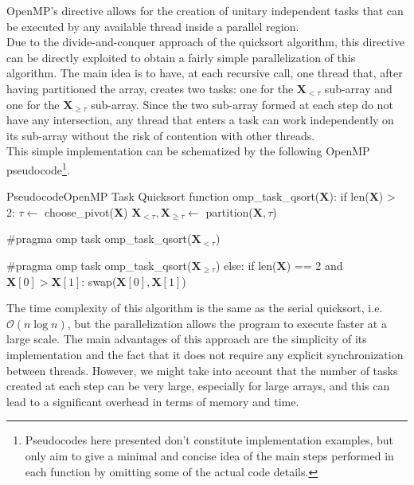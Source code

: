 \documentclass[../main.tex]{subfiles}
\begin{document}
OpenMP's  directive allows for the creation of unitary
independent tasks that can be executed by any available thread inside a
parallel region.\\
Due to the divide-and-conquer approach of the quicksort algorithm, this
directive can be directly exploited to obtain a fairly simple parallelization
of this algorithm. The main idea is to have, at each recursive call, one thread
that, after having partitioned the array, creates two tasks: one for the
$\mathbf{X}_{< \tau}$ sub-array and one for the $\mathbf{X}_{\geq \tau}$ sub-array. Since the two sub-array formed at each step do not have any
intersection, any thread that enters a task can work independently on
its sub-array without the risk of contention with other threads.\\
This simple implementation can be schematized by the following OpenMP
pseudocode\footnote{
Pseudocodes here presented don't constitute implementation examples, but only aim to give a minimal and concise idea of the main steps performed in each function by omitting some of the actual code details.
}.

\begin{codeblock}
\begin{code}{Pseudocode}{OpenMP Task Quicksort}
function omp_task_qsort($\mathbf{X}$):
    if len($\mathbf{X}$) > 2:
        $\tau \leftarrow$ choose_pivot($\mathbf{X}$)
        $\mathbf{X}_{< \tau}, \mathbf{X}_{\geq \tau} \leftarrow$ partition($\mathbf{X}, \tau$)

        #pragma omp task
        omp_task_qsort($\mathbf{X}_{< \tau}$)

        #pragma omp task
        omp_task_qsort($\mathbf{X}_{\geq \tau}$)
    else:
        if len($\mathbf{X}$) == 2 and $\mathbf{X}[0] > \mathbf{X}[1]$:
            swap($\mathbf{X}[0], \mathbf{X}[1]$)
\end{code}
\caption{Pseudocode for the OpenMP  function. Recursion ends when the array has length less then 2, where a simple swap is performed if needed.}
\label{code:omp_task}
\end{codeblock}

The time complexity of this algorithm is the same as the serial quicksort, i.e.\ $\mathcal{O}(n \log n)$, but the parallelization allows the program to execute faster at a large scale. The main advantages of this approach are the simplicity of its implementation and the fact that it does not require any explicit synchronization between threads. However, we might take into account that the number of tasks created at each step can be very large, especially for large arrays, and this can lead to a significant overhead in terms of memory and time.\\
\end{document}
